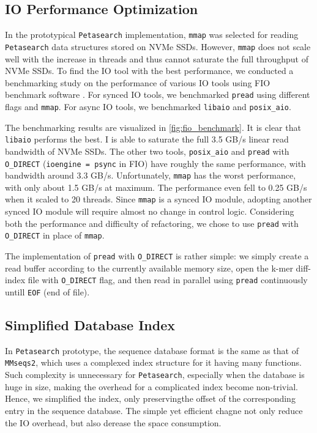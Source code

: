 \subsection{IO Performance Optimization} \label{section:io-performance}

In the prototypical \texttt{Petasearch} implementation, \texttt{mmap} was selected for reading \texttt{Petasearch} data structures stored on NVMe SSDs.
However, \texttt{mmap} does not scale well with the increase in threads \cite{papagiannis2020optimizing} and thus cannot saturate the full throughput of NVMe SSDs.
To find the IO tool with the best performance, we conducted a benchmarking study on the performance of various IO tools using FIO benchmark software \cite{AxboeFlexibleIOTester2022}.
For synced IO tools, we benchmarked \texttt{pread} using different flags and \texttt{mmap}.
For async IO tools, we benchmarked \texttt{libaio} and \texttt{posix\_aio}.

The benchmarking results are visualized in \autoref{fig:fio_benchmark}.
It is clear that \texttt{libaio} performs the best.
I is able to saturate the full 3.5 GB/s linear read bandwidth of NVMe SSDs.
The other two tools, \texttt{posix\_aio} and \texttt{pread} with \texttt{O\_DIRECT} (\texttt{ioengine = psync} in FIO) have roughly the same performance, with bandwidth around 3.3 GB/s.
Unfortunately, \texttt{mmap} has the worst performance, with only about 1.5 GB/s at maximum.
The performance even fell to 0.25 GB/s when it scaled to 20 threads.
Since \texttt{mmap} is a synced IO module, adopting another synced IO module will require almost no change in control logic.
Considering both the performance and difficulty of refactoring, we chose to use \texttt{pread} with \texttt{O\_DIRECT} in place of \texttt{mmap}.

The implementation of \texttt{pread} with \texttt{O\_DIRECT} is rather simple: we simply create a read buffer according to the currently available memory size, open the k-mer diff-index file with \texttt{O\_DIRECT} flag, and then read in parallel using \texttt{pread} continuously untill \texttt{EOF} (end of file).

\subsection{Simplified Database Index} \label{section:simplified-database-index}

In \texttt{Petasearch} prototype, the sequence database format is the same as that of \texttt{MMseqs2}, which uses a complexed index structure for it having many functions.
Such complexity is unnecessary for \texttt{Petasearch}, especially when the database is huge in size, making the overhead for a complicated index become non-trivial.
Hence, we simplified the index, only preservingthe offset of the corresponding entry in the sequence database.
The simple yet efficient chagne not only reduce the IO overhead, but also derease the space consumption.

